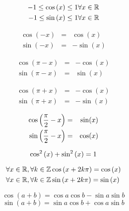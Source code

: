 
\begin{multicols}{2}

\begin{eqnarray}
-1 \leq \cos{(x)} \leq 1 & \forall x \in \mathbb{R} \\  
-1 \leq \sin{(x)} \leq 1 & \forall x \in \mathbb{R} 
\end{eqnarray}


\begin{eqnarray}
\cos(-x) & = & \cos{(x)}\\
\sin(-x) & = & -\sin{(x)}
\end{eqnarray}

\begin{eqnarray}
\cos(\pi - x) & = & -\cos(x)\\
\sin(\pi - x) & = &\sin(x)
\end{eqnarray}

\begin{eqnarray}
\cos(\pi + x) & = & -\cos(x)\\
\sin(\pi + x) & = & -\sin(x)
\end{eqnarray}

\begin{eqnarray}
\cos\left(\frac{\pi}{2} - x\right) & = & \sin(x)\\
\sin\left(\frac{\pi}{2} - x\right) & = &\cos(x)
\end{eqnarray}

\begin{equation}
\cos^2{(x)}+\sin^2{(x)} = 1\\
\end{equation}

\end{multicols}


\begin{eqnarray}{ }
\forall x \in \mathbb{R}, \forall k \in \mathbb{Z} & \cos\left(x + 2k \pi\right)  =  \cos\left(x\right) \\ 
\forall x \in \mathbb{R}, \forall k \in \mathbb{Z} & \sin\left(x + 2k \pi\right)  =  \sin\left(x\right)  
\end{eqnarray}

\begin{multicols}{2}

\begin{equation}
\cos(a+b) = \cos{a}\cos{b} - \sin{a}\sin{b}
\label{cosaplusb}
\end{equation}
%
%
\begin{equation}
\sin(a+b) = \sin{a}\cos{b} + \cos{a}\sin{b}
\label{sinaplusb}
\end{equation}

\end{multicols}




